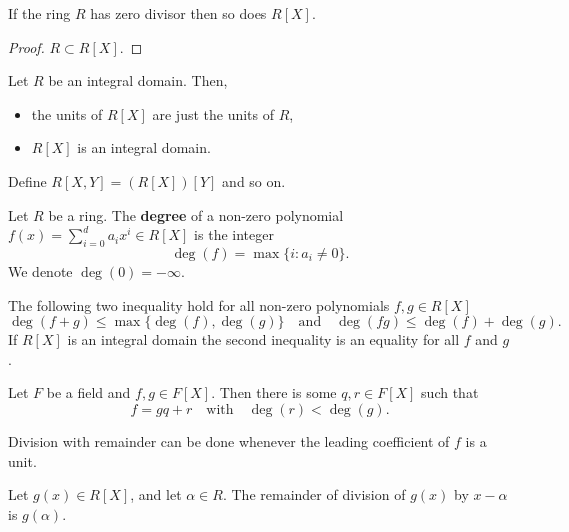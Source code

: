 \documentclass[12pt, a4paper]{article}
\begin{document}
\begin{proposition}
    If the ring \(R\) has zero divisor then so does \(R[X]\).
\end{proposition}

\begin{proof}
    \(R \subset R[X]\).
\end{proof}

\begin{mdprop}
    Let \(R\) be an integral domain. Then,
    \begin{itemize}
        \item the units of \(R[X]\) are just the units of \(R\),
        \item \(R[X]\) is an integral domain.
    \end{itemize}
\end{mdprop}

\begin{definition}
    Define \(R[X,Y]=\left( R[X] \right)[Y]\) and so on.
\end{definition}

\begin{definition}
    Let \(R\) be a ring. The \textbf{degree} of a non-zero polynomial \(f(x) = \sum_{i=0}^{d} a_i x^i \in R[X]\) is the integer 
    \[\deg(f) = \max\{i : a_i \neq 0\}.\]
    We denote \(\deg(0)=-\infty\).
\end{definition}

\begin{proposition}
    The following two inequality hold for all non-zero polynomials \(f,g\in R[X]\) 
    \[\deg(f+g)\leq \max\{\deg(f),\deg(g)\} \quad \text{and}\quad \deg(fg)\leq \deg(f)+\deg(g).\]
    If \(R[X]\) is an integral domain the second inequality is an equality for all \(f\) and \(g\).
\end{proposition}

\begin{mdprop}
    Let \(F\) be a field and \(f,g \in F[X]\). Then there is some \(q,r\in F[X]\) such that 
    \[f=gq+r \quad \text{with} \quad \deg(r) <\deg(g).\]
\end{mdprop}

\begin{corollary}
    Division with remainder can be done whenever the leading coefficient of \(f\) is a unit. 
\end{corollary}

\begin{corollary}
    Let \(g(x) \in R[X]\), and let \(\alpha \in R\). The remainder of division of \(g(x)\) by \(x-\alpha\) is \(g(\alpha)\).
\end{corollary}
\end{document}
